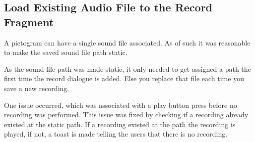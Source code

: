 \subsection{Load Existing Audio File to the Record Fragment}
A pictogram can have a single sound file associated.
As of such it was reasonable to make the saved sound file path static.

As the sound file path was made static, it only needed to get assigned a path the first time the record dialogue is added. 
Else you replace that file each time you save a new recording.

One issue occurred, which was associated with a play button press before no recording was performed.
This issue was fixed by checking if a recording already existed at the static path. If a recording existed at the path the recording is played, if not, a toast is made telling the users that there is no recording.
